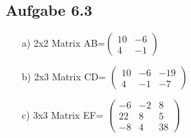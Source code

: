 \documentclass{standalone}
\begin{document}
\subsection{Aufgabe 6.3}
\begin{itemize}
	\item[a)] 2x2 Matrix AB=$\begin{pmatrix}
		10 & -6 \\
		4 & -1
	\end{pmatrix}$
	
	\item[b)] 2x3 Matrix CD=
	$\begin{pmatrix}
		10 & -6 & -19 \\
		4 & -1 & -7
	\end{pmatrix}$
	\item[c)] 3x3 Matrix EF=
	$\begin{pmatrix}
		-6 & -2 & 8 \\
		22 & 8 & 5 \\
		-8 & 4 & 38
	\end{pmatrix}$
	
\end{itemize}
\end{document}
